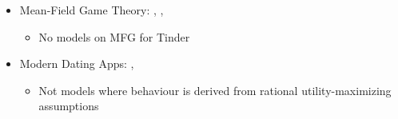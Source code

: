 \begin{itemize}
\begin{itemize}
\begin{itemize}
        \end{itemize}
    \end{itemize}
    \item Mean-Field Game Theory: \cite{iyer2014mean}, \cite{gummadi2013optimal}, \cite{jovanovic1988anonymous}
    \begin{itemize}
        \item No models on MFG for Tinder
    \end{itemize} 
    \item Modern Dating Apps: \cite{olmeda2021towards}, \cite{kanoria2021facilitating}
    \begin{itemize}
        \item Not models where behaviour is derived from rational utility-maximizing assumptions 
    \end{itemize}
\end{itemize}